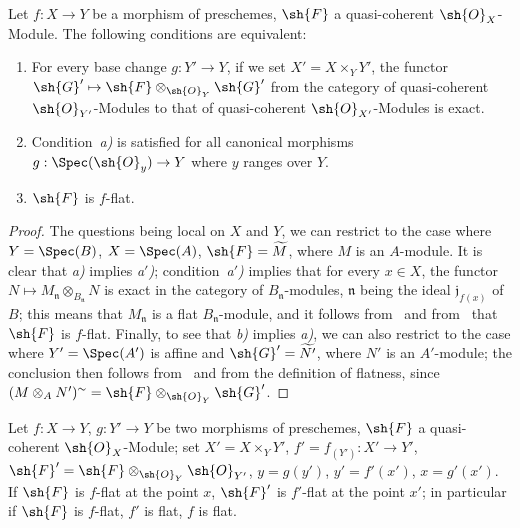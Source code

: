 \begin{proposition}[2.1.3]
\label{IV.2.1.3}
Let $f:X\to Y$ be a morphism of preschemes, $\sh{F}$ a quasi-coherent $\sh{O}_X$-Module. The following conditions are equivalent:
\begin{enumerate}[label=\emph{\alph*)}]
  \item For every base change $g:Y'\to Y$, if we set $X'=X\times_Y Y'$, the functor $\sh{G}'\mapsto\sh{F}\otimes_{\sh{O}_Y}\sh{G}'$ from the category of quasi-coherent $\sh{O}_{Y'}$-Modules to that of quasi-coherent $\sh{O}_{X'}$-Modules is exact.
  \item[\emph{a$'$)}] Condition~\emph{a)} is satisfied for all canonical morphisms $g:\Spec(\sh{O}_y)\to Y$ where $y$ ranges over $Y$.
  \item $\sh{F}$ is $f$-flat.
\end{enumerate}
\end{proposition}

\begin{proof}
The questions being local on $X$ and $Y$, we can restrict to the case where $Y=\Spec(B)$, $X=\Spec(A)$, $\sh{F}=\widetilde{M}$, where $M$ is an $A$-module.
It is clear that \emph{a)} implies \emph{a$'$)};
condition~\emph{a$'$)} implies that for every $x\in X$, the functor $N\mapsto M_\mathfrak{n}\otimes_{B_\mathfrak{n}}N$ is exact in the category of $B_\mathfrak{n}$-modules, $\mathfrak{n}$ being the ideal $\mathfrak{j}_{f(x)}$ of $B$; this means that $M_\mathfrak{n}$ is a flat $B_\mathfrak{n}$-module, and it follows from~ and from~ that $\sh{F}$ is $f$-flat.
Finally, to see that \emph{b)} implies \emph{a)}, we can also restrict to the case where $Y'=\Spec(A')$ is affine and $\sh{G}'=\widetilde{N'}$, where $N'$ is an $A'$-module; the conclusion then follows from~ and from the definition of flatness, since $(M\otimes_A N')^{\sim}=\sh{F}\otimes_{\sh{O}_Y}\sh{G}'$.
\end{proof}

\begin{proposition}[2.1.4]
\label{IV.2.1.4}
Let $f:X\to Y$, $g:Y'\to Y$ be two morphisms of preschemes, $\sh{F}$ a quasi-coherent $\sh{O}_X$-Module; set $X'=X\times_Y Y'$, $f'=f_{(Y')}:X'\to Y'$, $\sh{F}'=\sh{F}\otimes_{\sh{O}_Y}\sh{O}_{Y'}$, $y=g(y')$, $y'=f'(x')$, $x=g'(x')$.
If $\sh{F}$ is $f$-flat at the point $x$, $\sh{F}'$ is $f'$-flat at the point $x'$; in particular if $\sh{F}$ is $f$-flat, $f'$ is flat, $f$ is flat.
\end{proposition}

